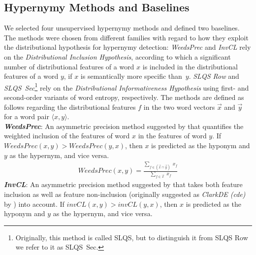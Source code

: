 \documentclass[11pt,a4paper]{article}
\begin{document}
\vspace{+2mm}
\subsection{Hypernymy Methods and Baselines}
\label{sec:methods}

We selected four unsupervised hypernymy methods and defined two
baselines. The methods were chosen from different families with regard
to how they exploit the distributional hypothesis for hypernymy
detection: \textit{WeedsPrec} and \textit{InvCL} rely on the
\textit{Distributional Inclusion Hypothesis}, according to which a
significant number of distributional features of a word $x$ is
included in the distributional features of a word $y$, if $x$ is
semantically more specific than~$y$. \textit{SLQS Row} and
\textit{SLQS~Sec}\footnote{Originally, this method is called SLQS, but
  to distinguish it from SLQS Row we refer to it as SLQS~Sec.}  rely
on the \textit{Distributional Informativeness Hypothesis} using first-
and second-order variants of word entropy, respectively. The methods
are defined as follows regarding the distributional features $f$ in
the two word vectors $\vec{x}$ and $\vec{y}$ for a word pair
$\langle x,y \rangle$.
\vspace{+4mm}\\
\textit{\textbf{WeedsPrec}}: An asymmetric precision method suggested
by  that quantifies the weighted inclusion of
the features of word $x$ in the features of word $y$. If
$WeedsPrec(x,y) > WeedsPrec(y,x)$, then $x$ is predicted as the
hyponym and $y$ as the hypernym, and vice versa.
\begin{align*}
  WeedsPrec(x,y) = \frac{\sum_{f \in (\overrightarrow{x} \cap \overrightarrow{y})} \; x_f}{\sum_{f \in \overrightarrow{x}} \; x_f}
\end{align*}
\textit{\textbf{InvCL}}: An asymmetric precision method suggested by
 that takes both feature inclusion as well
as feature non-inclusion (originally suggested as \textit{ClarkDE
  (cde)} by ) into account. If
$invCL(x,y) > invCL(y,x)$, then $x$ is predicted as the hyponym and
$y$ as the hypernym, and vice versa.
\end{document}
